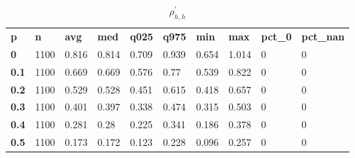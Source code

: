\begin{table}[h]
 \centering 
\footnotesize
\caption{$\rho_{h,h}^\prime $}
\label{tab:alphahh}
\begin{tabular}[h]{| l l l l l l l l l l|
    } \hline
\textbf{ p} & \textbf{ n} & \textbf{ avg} & \textbf{ med} & \textbf{ q025} & \textbf{ q975} & \textbf{ min} & \textbf{ max} & \textbf{ pct\_0} & \textbf{ pct\_nan}
           \\
  \textbf{  0} & 1100 & 0.816 & 0.814 & 0.709 & 0.939 & 0.654 & 1.014 & 0 & 0
           \\
  \textbf{0.1} & 1100 & 0.669 & 0.669 & 0.576 &  0.77 & 0.539 & 0.822 & 0 & 0
           \\
  \textbf{0.2} & 1100 & 0.529 & 0.528 & 0.451 & 0.615 & 0.418 & 0.657 & 0 & 0
           \\
  \textbf{0.3} & 1100 & 0.401 & 0.397 & 0.338 & 0.474 & 0.315 & 0.503 & 0 & 0
           \\
  \textbf{0.4} & 1100 & 0.281 &  0.28 & 0.225 & 0.341 & 0.186 & 0.378 & 0 & 0
           \\
  \textbf{0.5} & 1100 & 0.173 & 0.172 & 0.123 & 0.228 & 0.096 & 0.257 & 0 & 0
           \\
 \hline \end{tabular}
 \end{table}
